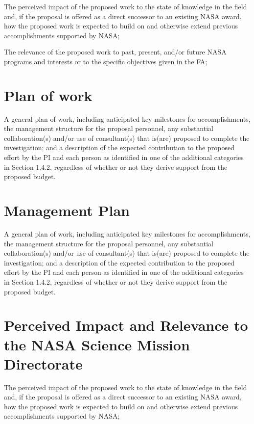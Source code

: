\documentclass[12pt]{article}
\begin{document}
The perceived impact of the proposed work to the state of knowledge
in the field and, if the proposal is offered as a direct successor
to an existing NASA award, how the proposed work is expected to
build on and otherwise extend previous accomplishments supported by
NASA;

The relevance of the proposed work to past, present, and/or future
NASA programs and interests or to the specific objectives given in
the FA;

\section{Plan of work}

A general plan of work, including anticipated key milestones for
  accomplishments, the management structure for the proposal
  personnel, any substantial collaboration(s) and/or use of
  consultant(s) that is(are) proposed to complete the investigation;
  and a description of the expected contribution to the proposed
  effort by the PI and each person as identified in one of the
  additional categories in Section 1.4.2, regardless of whether or not
  they derive support from the proposed budget.


\section{Management Plan}
\label{sec:management}
A general plan of work, including anticipated key milestones for
accomplishments, the management structure for the proposal personnel,
any substantial collaboration(s) and/or use of consultant(s) that
is(are) proposed to complete the investigation; and a description of
the expected contribution to the proposed effort by the PI and each
person as identified in one of the additional categories in Section
1.4.2, regardless of whether or not they derive support from the
proposed budget.




\section{Perceived Impact and Relevance to the NASA Science Mission Directorate}
\label{sec:relevance}
The perceived impact of the proposed work to the state of knowledge in
the field and, if the proposal is offered as a direct successor to an
existing NASA award, how the proposed work is expected to build on and
otherwise extend previous accomplishments supported by NASA;
\end{document}
